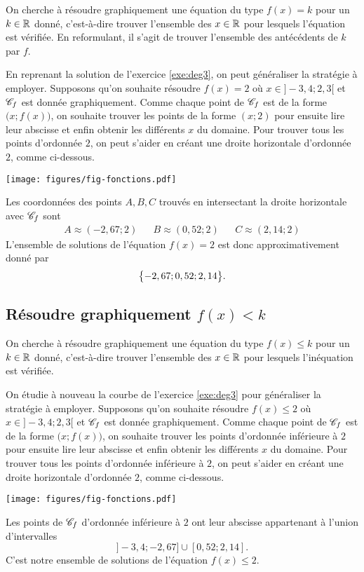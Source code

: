 On cherche à résoudre graphiquement une équation du type $f(x)=k$ pour un $k\in\mathbb{R}$ donné, c'est-à-dire trouver l'ensemble des $x\in\mathbb{R}$ pour lesquels l'équation est vérifiée.
En reformulant, il s'agit de trouver l'ensemble des antécédents de $k$ par $f$. 

En reprenant la solution de l'exercice \ref{exe:deg3}, on peut généraliser la stratégie à employer.
Supposons qu'on souhaite résoudre $f(x) = 2$ où $x\in]{-}3,4 ; 2,3[$ et $\mathcal{C}_f$ est donnée graphiquement.
Comme chaque point de $\mathcal{C}_f$ est de la forme $\bigl(x; f(x)\bigr)$, on souhaite trouver les points de la forme $(x;2)$ pour ensuite lire leur abscisse et enfin obtenir les différents $x$ du domaine.
Pour trouver tous les points d'ordonnée $2$, on peut s'aider en créant une droite horizontale d'ordonnée $2$, comme ci-dessous.
	\begin{center}
	\texttt{[image: figures/fig-fonctions.pdf]}
	\end{center}
Les coordonnées des points $A,B,C$ trouvés en intersectant la droite horizontale avec $\mathcal{C}_f$ sont
	\begin{align*}
		A \approx (-2,67 ; 2) && B \approx (0,52 ; 2) && C \approx (2,14 ; 2)
	\end{align*}
L'ensemble de solutions de l'équation $f(x)=2$ est donc approximativement donné par 
	\[ \bigl\{  -2,67 ; 0,52 ; 2,14  \bigr\}. \]





\newpage
\subsection*{Résoudre graphiquement $f(x) < k$}


On cherche à résoudre graphiquement une équation du type $f(x)\leq k$ pour un $k\in\mathbb{R}$ donné, c'est-à-dire trouver l'ensemble des $x\in\mathbb{R}$ pour lesquels l'inéquation est vérifiée.

On étudie à nouveau la courbe de l'exercice \ref{exe:deg3} pour généraliser la stratégie à employer.
Supposons qu'on souhaite résoudre $f(x) \leq 2$ où $x\in]{-}3,4 ; 2,3[$ et $\mathcal{C}_f$ est donnée graphiquement.
Comme chaque point de $\mathcal{C}_f$ est de la forme $\bigl(x; f(x)\bigr)$, on souhaite trouver les points d'ordonnée inférieure à $2$ pour ensuite lire leur abscisse et enfin obtenir les différents $x$ du domaine.
Pour trouver tous les points d'ordonnée inférieure à $2$, on peut s'aider en créant une droite horizontale d'ordonnée $2$, comme ci-dessous.
	\begin{center}
	 \texttt{[image: figures/fig-fonctions.pdf]}
	\end{center}
Les points de $\mathcal{C}_f$ d'ordonnée inférieure à $2$ ont leur abscisse appartenant à l'union d'intervalles
	\[ ] {-}3,4 ; -2,67 ] \cup [0,52 ; 2,14]. \]
C'est notre ensemble de solutions de l'équation $f(x) \leq 2$.


